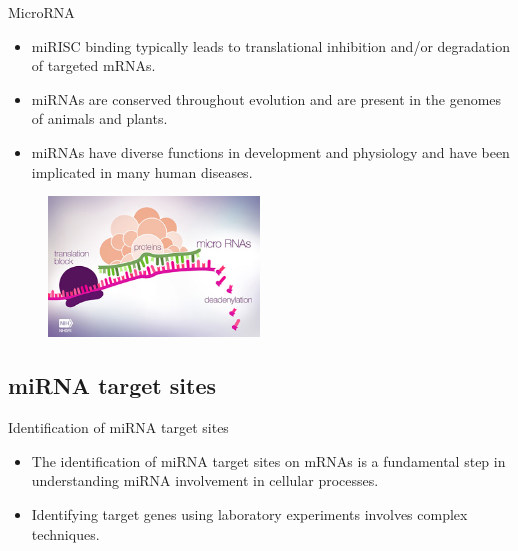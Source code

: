 \documentclass{beamer}
\begin{document}
\begin{frame}{MicroRNA}
	\begin{itemize}
\item miRISC binding typically leads to translational inhibition and/or degradation of targeted mRNAs.
\item miRNAs are conserved throughout evolution and are present in the genomes of animals and plants.  
\item miRNAs have diverse functions in development and physiology and have been implicated in many human diseases.
\end{itemize}

\begin{figure}[ht!]
	  \centering
	      
    \includegraphics[width=0.5\textwidth]{images/micro_rna2910516058.jpg} 
\end{figure}


\end{frame}

\subsection{miRNA target sites}
\begin{frame}{Identification of miRNA target sites}
	\begin{itemize}
	\item The identification of miRNA target sites on mRNAs is a fundamental step in understanding miRNA involvement in cellular processes.

	\item Identifying target genes using laboratory experiments involves complex techniques.
\end{itemize}
\end{frame}
\end{document}
